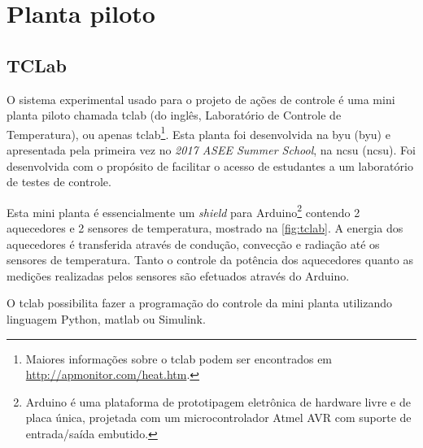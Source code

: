 
\chapter{Planta piloto}
\label{ch:planta_piloto}

\section{TCLab}
\label{sec:tclab}

O sistema experimental usado para o projeto de ações de controle é uma mini planta piloto chamada \acrlong{tclab}
(do inglês, Laboratório de Controle de Temperatura), ou apenas \acrshort{tclab}\footnote{                       %
    Maiores informações sobre o \acrshort{tclab} podem ser encontrados em \href{http://apmonitor.com/heat.htm}{http://apmonitor.com/heat.htm}.
}. Esta planta foi desenvolvida na \acrlong{byu} (\acrshort{byu}) e apresentada pela primeira vez no
\textit{2017 ASEE Summer School}, na \acrlong{ncsu} (\acrshort{ncsu}). Foi desenvolvida com o
propósito de facilitar o acesso de estudantes a um laboratório de testes de controle.

Esta mini planta é essencialmente um \textit{shield} para Arduino\footnote{
    Arduino é uma plataforma de prototipagem eletrônica de hardware livre e de placa única, projetada com um    %
    microcontrolador Atmel AVR com suporte de entrada/saída embutido.                                           %
} contendo 2 aquecedores e 2 sensores de temperatura, mostrado na \cref{fig:tclab}. A energia dos aquecedores é
transferida através de condução, convecção e radiação até os sensores de temperatura. Tanto o controle da
potência dos aquecedores quanto as medições realizadas pelos sensores são efetuados através do Arduino.

O \acrshort{tclab} possibilita fazer a programação do controle da mini planta utilizando linguagem Python,
\acrshort{matlab} ou Simulink.

